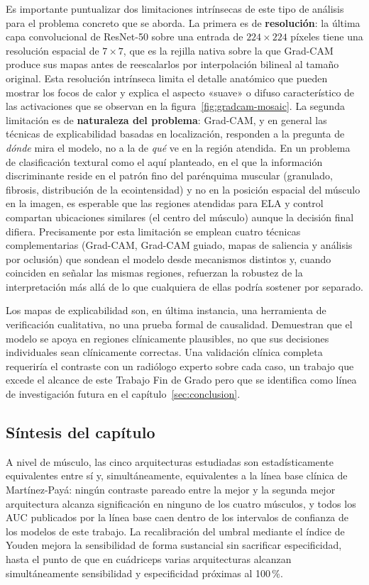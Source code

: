 \documentclass[12pt]{extarticle}
\numberwithin{equation}{section}
\begin{document}
\begin{refsection}
Es importante puntualizar dos limitaciones intrínsecas de este tipo de análisis para el problema concreto que se aborda. La primera es de \textbf{resolución}: la última capa convolucional de ResNet-50 sobre una entrada de $224\times 224$ píxeles tiene una resolución espacial de $7\times 7$, que es la rejilla nativa sobre la que Grad-CAM produce sus mapas antes de reescalarlos por interpolación bilineal al tamaño original. Esta resolución intrínseca limita el detalle anatómico que pueden mostrar los focos de calor y explica el aspecto «suave» o difuso característico de las activaciones que se observan en la figura~\ref{fig:gradcam-mosaic}. La segunda limitación es de \textbf{naturaleza del problema}: Grad-CAM, y en general las técnicas de explicabilidad basadas en localización, responden a la pregunta de \textit{dónde} mira el modelo, no a la de \textit{qué} ve en la región atendida. En un problema de clasificación textural como el aquí planteado, en el que la información discriminante reside en el patrón fino del parénquima muscular (granulado, fibrosis, distribución de la ecointensidad) y no en la posición espacial del músculo en la imagen, es esperable que las regiones atendidas para ELA y control compartan ubicaciones similares (el centro del músculo) aunque la decisión final difiera. Precisamente por esta limitación se emplean cuatro técnicas complementarias (Grad-CAM, Grad-CAM guiado, mapas de saliencia y análisis por oclusión) que sondean el modelo desde mecanismos distintos y, cuando coinciden en señalar las mismas regiones, refuerzan la robustez de la interpretación más allá de lo que cualquiera de ellas podría sostener por separado.

Los mapas de explicabilidad son, en última instancia, una herramienta de verificación cualitativa, no una prueba formal de causalidad. Demuestran que el modelo se apoya en regiones clínicamente plausibles, no que sus decisiones individuales sean clínicamente correctas. Una validación clínica completa requeriría el contraste con un radiólogo experto sobre cada caso, un trabajo que excede el alcance de este Trabajo Fin de Grado pero que se identifica como línea de investigación futura en el capítulo~\ref{sec:conclusion}.

\subsection{Síntesis del capítulo}\label{subsec:resultados-resumen}

A nivel de músculo, las cinco arquitecturas estudiadas son estadísticamente equivalentes entre sí y, simultáneamente, equivalentes a la línea base clínica de Martínez-Payá: ningún contraste pareado entre la mejor y la segunda mejor arquitectura alcanza significación en ninguno de los cuatro músculos, y todos los AUC publicados por la línea base caen dentro de los intervalos de confianza de los modelos de este trabajo. La recalibración del umbral mediante el índice de Youden mejora la sensibilidad de forma sustancial sin sacrificar especificidad, hasta el punto de que en cuádriceps varias arquitecturas alcanzan simultáneamente sensibilidad y especificidad próximas al 100\,\%.


\end{refsection}
\end{document}
